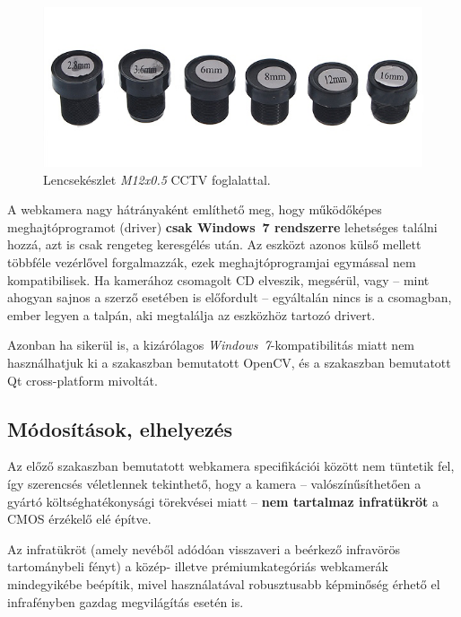 \begin{figure}[!ht]
\centering
\includegraphics[width=140mm, keepaspectratio]{figures/lenses.png}
\caption{Lencsekészlet \emph{M12x0.5} CCTV foglalattal.}
\label{fig:lenses}
\end{figure}

A webkamera nagy hátrányaként említhető meg, hogy működőképes meghajtóprogramot (driver) \textbf{csak Windows~7 rendszerre} lehetséges találni hozzá, azt is csak rengeteg keresgélés után. Az eszközt azonos külső mellett többféle vezérlővel forgalmazzák, ezek meghajtóprogramjai egymással nem kompatibilisek. Ha kamerához csomagolt CD elveszik, megsérül, vagy -- mint ahogyan sajnos a szerző esetében is előfordult -- egyáltalán nincs is a csomagban, ember legyen a talpán, aki megtalálja az eszközhöz tartozó drivert.

Azonban ha sikerül is, a kizárólagos \emph{Windows~7}-kompatibilitás miatt nem használhatjuk ki a  szakaszban bemutatott OpenCV, és a  szakaszban bemutatott Qt cross-platform mivoltát.

\subsection{Módosítások, elhelyezés}\label{sect:infracam_mod}

Az előző szakaszban bemutatott webkamera specifikációi között nem tüntetik fel, így szerencsés véletlennek tekinthető, hogy a kamera -- valószínűsíthetően a gyártó költséghatékonysági törekvései miatt -- \textbf{nem tartalmaz infratükröt} a CMOS érzékelő elé építve.

Az infratükröt (amely nevéből adódóan visszaveri a beérkező infravörös tartománybeli fényt) a közép- illetve prémiumkategóriás webkamerák mindegyikébe beépítik, mivel használatával robusztusabb képminőség érhető el infrafényben gazdag megvilágítás esetén is.

